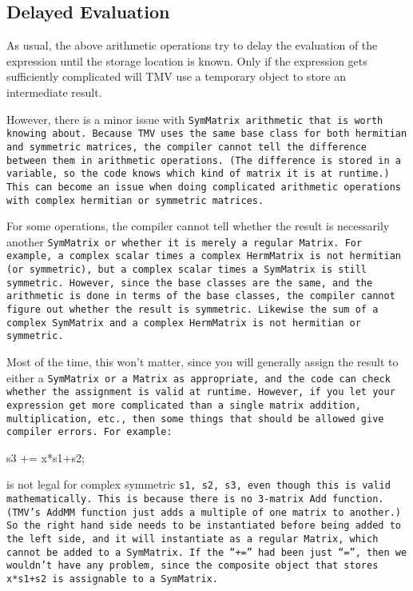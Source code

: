 \subsection{Delayed Evaluation}

As usual, the above arithmetic operations try to delay the evaluation 
of the expression until the storage location is known.  Only if the 
expression gets sufficiently complicated will TMV use a temporary
object to store an intermediate result.

However, there is a minor issue with \tt{SymMatrix} arithmetic that is
worth knowing about.
Because TMV uses the same base class for both hermitian and symmetric
matrices, the compiler cannot tell the difference between them in arithmetic
operations.  (The difference is stored in a variable, so the code knows which kind of matrix it is at runtime.)
This can become an issue when doing complicated arithmetic operations
with complex hermitian or symmetric matrices.

For some operations, the compiler cannot tell whether the result is
necessarily another \tt{SymMatrix} or whether it is merely a regular
\tt{Matrix}.
For example, a complex scalar times a complex \tt{HermMatrix} is not 
hermitian (or symmetric), but a complex scalar times a \tt{SymMatrix}
is still symmetric.  However, since the base classes are the same, and the 
arithmetic is done in terms of the base classes, the compiler cannot
figure out whether the result is symmetric.
Likewise the sum of a complex \tt{SymMatrix} and a complex \tt{HermMatrix} is not hermitian or symmetric.

Most of the time, this won't matter, since
you will generally assign the result to either a \tt{SymMatrix} or a \tt{Matrix}
as appropriate, and the code can check whether the assignment is valid at runtime.  
However, if you let your expression get more complicated than a single
matrix addition, multiplication, etc., then some things that should be allowed give compiler errors.
For example:
\begin{tmvcode}
s3 += x*s1+s2;
\end{tmvcode}
is not legal for complex symmetric \tt{s1, s2, s3}, even though this is valid mathematically.
This is because there is no 3-matrix 
\tt{Add} function.  (TMV's \tt{AddMM} function just adds a multiple of one 
matrix to another.)  So the right hand side needs to be instantiated before
being added to the left side, and it will instantiate as a regular \tt{Matrix},
which cannot be added to a \tt{SymMatrix}.  
If the ``\tt{+=}'' had been just ``\tt{=}'', then we wouldn't have any problem,
since the composite object that stores \tt{x*s1+s2} is assignable to a \tt{SymMatrix}.

